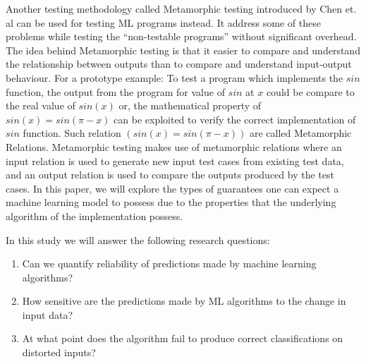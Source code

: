Another testing methodology called Metamorphic testing introduced by Chen et. al can be used for testing ML programs instead. It address some of these problems while testing the \enquote{non-testable programs} without significant overhead. The idea behind Metamorphic testing is that it easier to compare and understand the relationship between outputs than to compare and understand input-output behaviour. For a prototype example: To test a program which implements the $sin$ function, the output from the program for value of $sin$ at $x$ could be compare to the real value of $sin(x)$ or, the mathematical property of $sin(x) = sin(\pi-x)$ can be exploited to verify the correct implementation of $sin$ function. Such relation $(sin(x) = sin(\pi-x))$ are called Metamorphic Relations. Metamorphic testing makes use of metamorphic relations where an input relation is used to generate new input test cases from existing test data, and an output relation is used to compare the outputs produced by the test cases.\newline
In this paper, we will explore the types of guarantees one can expect a machine learning model to possess due to the properties that the underlying algorithm of the implementation possess.


In this study we will answer the following research questions:
\begin{enumerate}
  \item Can we quantify reliability of predictions made by machine learning algorithms?
  \item How sensitive are the predictions made by ML algorithms to the change in input data?
  \item At what point does the algorithm fail to produce correct classifications on distorted inputs?
\end{enumerate}
%
